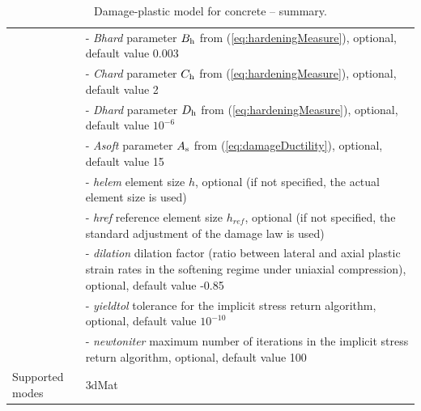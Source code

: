 \documentclass[a4paper]{article}
\newcommand{\param}[1]{{\it #1}}
\newenvironment{mmt}{\begin{tabular}{|l|p{9cm}|}}{\end{tabular}\\}
\newenvironment{mmt}{\begin{tabular}{|l|l|}}{\end{tabular}\\}
\begin{document}
\begin{table}[!htb]
\begin{mmt}
&- \param{Bhard} parameter $B_{\rm h}$ from (\ref{eq:hardeningMeasure}), optional, default value 0.003\\
&- \param{Chard} parameter $C_{\rm h}$ from (\ref{eq:hardeningMeasure}), optional, default value 2\\
&- \param{Dhard} parameter $D_{\rm h}$ from (\ref{eq:hardeningMeasure}), optional, default value $10^{-6}$\\
&- \param{Asoft} parameter $A_{\rm s}$ from (\ref{eq:damageDuctility}), optional, default value 15\\
&- \param{helem} element size $h$, optional (if not specified, the actual element size is used)\\
&- \param{href} reference element size $h_{ref}$, optional (if not specified, the standard adjustment of the damage law is used)\\
&- \param{dilation} dilation factor (ratio between lateral and axial plastic strain rates in the softening regime under uniaxial compression), optional, default value -0.85\\
&- \param{yieldtol} tolerance for the implicit stress return algorithm, optional, default value $10^{-10}$\\
&- \param{newtoniter} maximum number of iterations in the implicit stress return algorithm, optional, default value 100\\
Supported modes& 3dMat\\
\hline
\end{mmt}
\caption{Damage-plastic model for concrete -- summary.}
\label{dpm_table}
\end{table}
\end{document}
